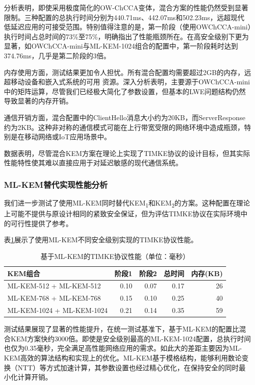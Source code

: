 分析表明，即使采用极度简化的OW-ChCCA变体，混合方案的性能仍然受到显著限制。三种配置的总执行时间分别为440.71ms、442.07ms和502.23ms，远超现代低延迟应用的可接受范围。特别值得注意的是，第一阶段（使用OWChCCA-mini）执行时间占总时间的73\%至75\%，明确指出了性能瓶颈所在。在高安全级别下更为显著，如OWChCCA-mini与ML-KEM-1024组合的配置中，第一阶段耗时达到374.76ms，几乎是第二阶段的3倍。

内存使用方面，测试结果更加令人担忧。所有混合配置均需要超过2GB的内存，远超移动设备和嵌入式系统的可用
资源。深入分析表明，主要源于OWChCCA-mini中的矩阵运算，尽管我们已经极大简化了参数设置，但基本的LWE问题结构仍然导致显著的内存开销。

通信开销方面，混合配置中的ClientHello消息大小约为20KB，而ServerResponse约为2KB。这种非对称的通信模式可能在上行带宽受限的网络环境中造成瓶颈，特别是在移动网络或IoT应用场景中。

数据表明，尽管混合KEM方案在理论上实现了TIMKE协议的设计目标，但其实际性能特性使其难以直接应用于对延迟敏感的现代通信系统。
\subsubsection{ML-KEM替代实现性能分析}

我们进一步测试了使用ML-KEM同时替代KEM\textsubscript{1}和KEM\textsubscript{2}的方案。这种配置在理论上可能不提供与原设计相同的紧致安全保证，但为评估TIMKE协议在实际环境中的可行性提供了参考。

表\ref{tab:timke-mlkem-perf}展示了使用ML-KEM不同安全级别实现的TIMKE协议性能。

\begin{table}[ht]
\centering
\caption{基于ML-KEM的TIMKE协议性能（单位：毫秒）}
\label{tab:timke-mlkem-perf}
\begin{tabular}{|l|r|r|r|r|}
\hline
\textbf{KEM组合} & \textbf{阶段1} & \textbf{阶段2} & \textbf{总时间} & \textbf{内存(KB)} \\
\hline
ML-KEM-512 + ML-KEM-512    & 0.10  & 0.07  & 0.17  & 26   \\
\hline
ML-KEM-768 + ML-KEM-768    & 0.15  & 0.10  & 0.25  & 40   \\
\hline
ML-KEM-1024 + ML-KEM-1024  & 0.21  & 0.14  & 0.35  & 59   \\
\hline
\end{tabular}
\end{table}

测试结果展现了显著的性能提升，在统一测试基准下，基于ML-KEM的配置比混合KEM方案快约3000倍。即使是安全级别最高的ML-KEM-1024配置，总执行时间也仅为0.35毫秒，完全满足高性能网络应用的需求。如此大的差距主要因为ML-KEM高效的算法结构和实现上的优化。ML-KEM基于模格结构，能够利用数论变换（NTT）等方式加速计算，其参数设置也经过精心优化，在保持安全的同时最小化计算开销。

